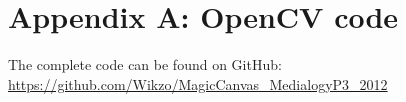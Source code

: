 \chapter{Appendix A: OpenCV code}
%

The complete code can be found on GitHub: \url{https://github.com/Wikzo/MagicCanvas_MedialogyP3_2012}